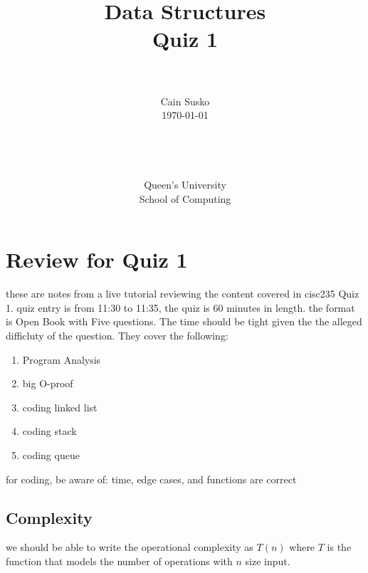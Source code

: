\documentclass[12pt]{book}
\newcommand{\classID}{Quiz 1}
\begin{document}
\date{}
\setlength{\parindent}{0em}  %

\title{Data Structures\\\classID}

\author{\\ \\ Cain Susko\\\today \\ \\ \\ \\ \\
        Queen's University \\School of Computing} 
 

\maketitle
\pagebreak

\section*{Review for Quiz 1}

these are notes from a live tutorial reviewing the content covered
in cisc235 Quiz 1.
quiz entry is from 11:30 to 11:35, the quiz is 60 minutes in length.
the format is Open Book with Five questions. The time should be tight given the 
the alleged difficluty of the question. They cover the following:
\begin{enumerate}
        \item Program Analysis
        \item big O-proof
        \item coding linked list
        \item coding stack
        \item coding queue
\end{enumerate}
for coding, be aware of: time, edge cases, and functions are correct
 
\subsection*{Complexity}
we should be able to write the operational complexity as $T(n)$ where $T$ is the function that
models the number of operations with $n$ size input.
\end{document}
